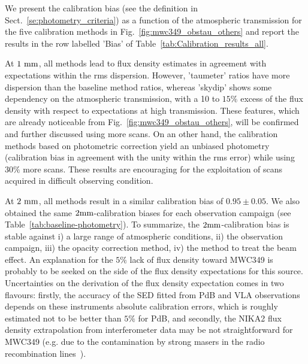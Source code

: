 We present the calibration bias (see the definition in
Sect.~\ref{se:photometry_criteria}) as a function of the atmospheric
transmission for the five calibration methods in
Fig.~\ref{fig:mwc349_obstau_others} and report the results in the row
labelled 'Bias' of Table~\ref{tab:Calibration_results_all}. 

At $1~\rm{mm}$, all methods lead to flux density estimates in
agreement with expectations within the rms dispersion. However,
'taumeter' ratios have more dispersion than the baseline method
ratios, whereas 'skydip' shows some dependency on the atmospheric
transmission, with a 10 to $15\%$ excess of the flux density with
respect to expectations at high transmission. These features, which are
already noticeable from Fig.~\ref{fig:mwc349_obstau_others}, will be
confirmed and further discussed using more scans. On an other hand,
the calibration methods based on photometric correction yield an
unbiased photometry (calibration bias in agreement with the unity
within the rms error) while using $30\%$ more scans. These results are
encouraging for the exploitation of scans acquired in difficult
observing condition.

At $2~\rm{mm}$, all methods result in a similar calibration bias
of $0.95 \pm 0.05$. We also obtained the same $2\rm{mm}$-calibration
biases for each observation campaign (see
Table~\ref{tab:baseline-photometry}). To summarize, the
$2\rm{mm}$-calibration bias is stable against i) a large range of
atmospheric conditions, ii) the observation campaign, iii) the
opacity correction method, iv) the method to treat the beam
effect. An explanation for the $5\%$ lack of flux density toward
MWC349 is probably to be seeked on the side of the flux density
expectations for this source. Uncertainties on the
derivation of the flux density expectation comes in two flavours:
firstly, the accuracy of the SED fitted from PdB and VLA observations
depends on these instruments absolute calibration errors, which is
roughly estimated not to be better than $5\%$ for PdB, and secondly,
the NIKA2 flux density extrapolation from
interferometer data may be not straightforward for MWC349 (e.g. due to
the contamination by strong masers in the radio recombination lines~\cite{masingRRL}).

